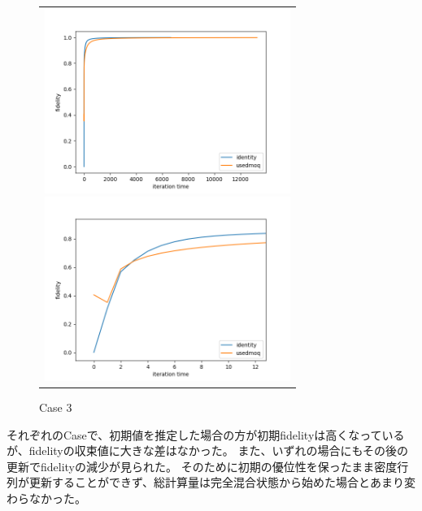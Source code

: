 \documentclass[11pt,a4j,notitlepage]{jreport}
\begin{document}
	\begin{figure}[htbp]
		\centering
			\begin{tabular}{c}
	  
			\begin{minipage}{0.5\hsize}
			\begin{center}
				\includegraphics[clip, width=8cm]{./picture/fpmixed.png}
			\end{center}
			\end{minipage}
	  
			\begin{minipage}{0.5\hsize}
			\begin{center}
				\includegraphics[clip, width=8cm]{./picture/fpmixedextended.png}
			\end{center}
			\end{minipage}
			
		\end{tabular}
		\caption{Case 3}
	\end{figure}

	それぞれのCaseで、初期値を推定した場合の方が初期fidelityは高くなっているが、fidelityの収束値に大きな差はなかった。
	また、いずれの場合にもその後の更新でfidelityの減少が見られた。
	そのために初期の優位性を保ったまま密度行列が更新することができず、総計算量は完全混合状態から始めた場合とあまり変わらなかった。


	\newpage
\end{document}
